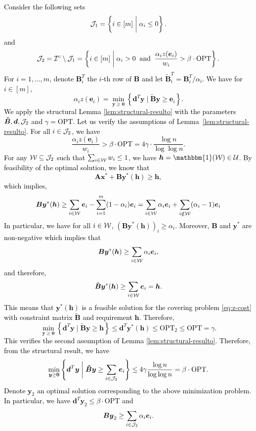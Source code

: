 \documentclass[moor]{informs1}              %
\newcommand{\opt}{\mathrm{OPT}}
\newcommand{\mb}[1]{\ensuremath{\boldsymbol{#1}}}
\newcommand*{\red}{\textcolor{black}}
\begin{document}
\red{
Consider the following sets
$${\cal J}_{1}= \left\{ i \in [m] \; \bigg\vert \; \alpha_i \leq  0 \right\}.$$
and 
$$ {\cal J}_2= {\cal I}^c  \setminus{\cal J}_1 =\left\{ i \in [m] \; \bigg\vert \;  \alpha_i  >0  \;\; \text{and}  \; \; \frac{ \alpha_i z(\mb e_i)}{w_i}   >\beta \cdot \opt \right\}.$$
For $i=1,\ldots,m$,  denote $\mb B^T_i$ the $i$-th row of $\mb B$ and let $  \mb{\tilde{B}}^T_i = \mb B^T_i / \alpha_i$. We have for $i \in [m]$, 
$$ \alpha_i z( \mb e_i)= \min_{\mb y \geq \mb 0} \left\{ \mb d^T \mb y \; \bigg\vert \; \mb{\tilde{B}} \mb y \geq \mb e_i \right\}.$$
We apply the structural Lemma \ref{lem:structural-resulto} with the parameters $\mb{\tilde{B}}, \mb d , {\cal J}_{2}$ and $\gamma =  \opt$. Let us verify the assumptions of Lemma~\ref{lem:structural-resulto}. For all $i \in {\cal J}_{2}$, we have
$$  \frac{  \alpha_i  z( \mb e_i)}{w_i}  > \beta  \cdot \opt = 4 \gamma \cdot \frac{\log n}{\log \log n}.$$
For any ${\cal W} \subseteq {\cal J}_{2}$  such that $\sum_{i \in {\cal W}} w_i \leq 1$, we have  $\mb h = \mathbbm{1} ({\cal W} ) \in \cal{U}$. By feasibility of the optimal solution, we know that 
$$ \mb A \mb x^*+ \mb B \mb y^*(\mb h) \geq \mb h,$$
which implies,
$$ \mb B \mb y^*(\mb h) \geq \sum_{i \in {\cal W}}  \mb e_i -       \sum_{i=1}^m (1- \alpha_i) \mb e_i  = \sum_{i \in {\cal W}} \alpha_i \mb e_i + \sum_{i \notin {\cal W}} ( \alpha_i-1) \mb e_i   $$
In particular, we have for all $i \in {\cal W}$, $(\mb B \mb y^*(\mb h))_i \geq \alpha_i$. Moreover, $\mb B$ and $\mb y^*$ are non-negative which implies that
$$ \mb B \mb y^*(\mb h) \geq \sum_{i \in {\cal W}} \alpha_i \mb e_i,$$
and therefore,
$$ \tilde{\mb B}\mb y^*(\mb h) \geq \sum_{i \in {\cal W}} \mb e_i = \mb h.$$
This means that $\mb{y}^* (\mb h)$ is a feasible solution for the covering problem \eqref{eq:z-cost} with constraint matrix $\tilde{\mb B}$ and requirement $\mb h$. Therefore,
$$\min_{\mb y \geq \mb 0} \left\{ \mb d^T \mb y \; \bigg\vert \; \mb{\tilde{B}} \mb y \geq \mb h \right\} \leq  \mb d^T  \mb{y}^* (\mb h)  \leq   \opt_2 \leq    \opt = \gamma.$$
This verifies the second assumption of Lemma \ref{lem:structural-resulto}. Therefore, from the structural result, we have 
$$ \min_{\mb y \geq \mb 0} \left\{ \mb d^T \mb y \; \bigg\vert \; \mb{\tilde{B}} \mb y \geq \sum_{i \in {\cal J}_{2} }  \mb e_i\right\}   \leq 4 \gamma  \frac{\log n}{\log \log n} =\beta \cdot \opt.$$ 
Denote $\mb y_2$ an optimal solution corresponding to the above minimization problem. In particular, we have $\mb d^T \mb y_2 \leq  \beta \cdot \opt$ and 
$$ \mb B \mb y_2 \geq \sum_{i \in {\cal J}_{2} } \alpha_i \mb e_i.$$
}
\end{document}
